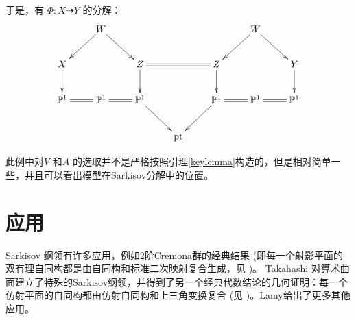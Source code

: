 于是，有 $\Phi: X\dashrightarrow  Y$ 的分解：
\[ \xymatrix{
                                   & W\ar[ld]\ar[rd]          &                       &           &                                 & W\ar[ld]\ar[rd] \\
    X\ar[d]                        &                          & Z\ar[d]\ar@{=}[rr]    &           & Z\ar[d]                         &                           & Y\ar[d]\\
    \mathbb{P}^{1}\ar@{=}[r]       & \mathbb{P}^{1}\ar@{=}[r] & \mathbb{P}^{1}\ar[dr] &           & \mathbb{P}^{1}\ar[dl]\ar@{=}[r] & \mathbb{P}^{1}\ar@{=}[r] & \mathbb{P}^{1} \\
                                   &                          &                       & \text{pt} &                                 &                           & }\]
\begin{remark}
此例中对$V$ 和$A$ 的选取并不是严格按照引理\ref{keylemma}构造的，但是相对简单一些，并且可以看出模型在Sarkisov分解中的位置。
\end{remark}

\section{应用}

Sarkisov 纲领有许多应用，例如2阶Cremona群的经典结果 (即每一个射影平面的双有理自同构都是由自同构和标准二次映射复合生成，见 \cite[Chapter 2]{ksc04} )。 Takahashi \cite{tak95} 对算术曲面建立了特殊的Sarkisov纲领，并得到了另一个经典代数结论的几何证明：每一个仿射平面的自同构都由仿射自同构和上三角变换复合 (见 \cite[Chpter 13]{mat02})。Lamy\cite{lam22}给出了更多其他应用。
